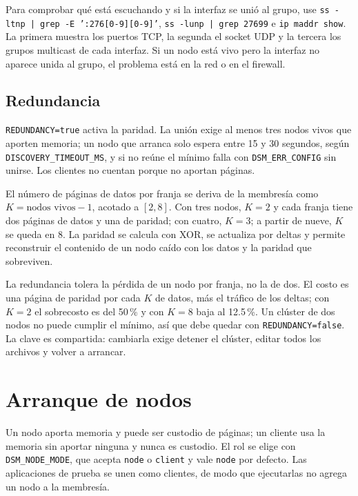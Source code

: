 Para comprobar qué está escuchando y si la interfaz se unió al grupo, use \texttt{ss -ltnp | grep -E ':276[0-9][0-9]'}, \texttt{ss -lunp | grep 27699} e \texttt{ip maddr show}. La primera muestra los puertos TCP, la segunda el socket UDP y la tercera los grupos multicast de cada interfaz. Si un nodo está vivo pero la interfaz no aparece unida al grupo, el problema está en la red o en el firewall.

\subsection{Redundancia}\label{subsec:redundancia}

\texttt{REDUNDANCY=true} activa la paridad. La unión exige al menos tres nodos vivos que aporten memoria; un nodo que arranca solo espera entre 15 y 30 segundos, según \texttt{DISCOVERY\_TIMEOUT\_MS}, y si no reúne el mínimo falla con \texttt{DSM\_ERR\_CONFIG} sin unirse. Los clientes no cuentan porque no aportan páginas.

El número de páginas de datos por franja se deriva de la membresía como $K = \text{nodos vivos} - 1$, acotado a $[2,8]$. Con tres nodos, $K=2$ y cada franja tiene dos páginas de datos y una de paridad; con cuatro, $K=3$; a partir de nueve, $K$ se queda en 8. La paridad se calcula con XOR, se actualiza por deltas y permite reconstruir el contenido de un nodo caído con los datos y la paridad que sobreviven.

La redundancia tolera la pérdida de un nodo por franja, no la de dos. El costo es una página de paridad por cada $K$ de datos, más el tráfico de los deltas; con $K=2$ el sobrecosto es del 50\,\% y con $K=8$ baja al 12.5\,\%. Un clúster de dos nodos no puede cumplir el mínimo, así que debe quedar con \texttt{REDUNDANCY=false}. La clave es compartida: cambiarla exige detener el clúster, editar todos los archivos y volver a arrancar.

\section{Arranque de nodos}\label{sec:arranque}

Un nodo aporta memoria y puede ser custodio de páginas; un cliente usa la memoria sin aportar ninguna y nunca es custodio. El rol se elige con \texttt{DSM\_NODE\_MODE}, que acepta \texttt{node} o \texttt{client} y vale \texttt{node} por defecto. Las aplicaciones de prueba se unen como clientes, de modo que ejecutarlas no agrega un nodo a la membresía.

